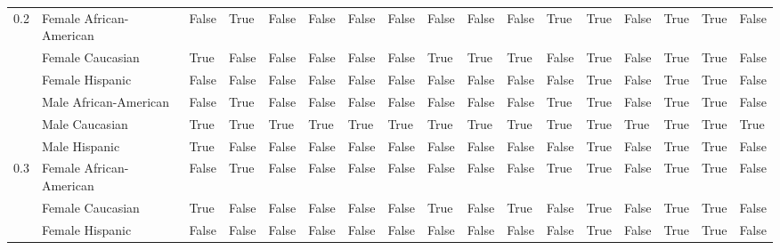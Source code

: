 \begin{tabular}{lllllllllllllllll}
0.2 & Female African-American &       False &        True &                  False &       False &          False &                False &           False &       False &       False &        True &              True &         False &        True &           True &               False \\
    & Female Caucasian &        True &       False &                  False &       False &          False &                False &            True &        True &        True &       False &              True &         False &        True &           True &               False \\
    & Female Hispanic &       False &       False &                  False &       False &          False &                False &           False &       False &       False &       False &              True &         False &        True &           True &               False \\
    & Male African-American &       False &        True &                  False &       False &          False &                False &           False &       False &       False &        True &              True &         False &        True &           True &               False \\
    & Male Caucasian &        True &        True &                   True &        True &           True &                 True &            True &        True &        True &        True &              True &          True &        True &           True &                True \\
    & Male Hispanic &        True &       False &                  False &       False &          False &                False &           False &       False &       False &       False &              True &         False &        True &           True &               False \\
0.3 & Female African-American &       False &        True &                  False &       False &          False &                False &           False &       False &       False &        True &              True &         False &        True &           True &               False \\
    & Female Caucasian &        True &       False &                  False &       False &          False &                False &            True &       False &        True &       False &              True &         False &        True &           True &               False \\
    & Female Hispanic &       False &       False &                  False &       False &          False &                False &           False &       False &       False &       False &              True &         False &        True &           True &               False \\

\end{tabular}
